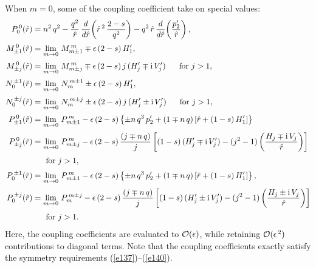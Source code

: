 \documentclass[12pt,prb,aps]{revtex4-1}
\begin{document}
When $m=0$, some of the coupling coefficient take on special values: 
\begin{align}
P_0^{\,0}(\hat{r})&=n^2\,q^2-\frac{q^2}{\hat{r}}\,\frac{d}{d\hat{r}}\!\left(\hat{r}^{\,2}\,\frac{2-s}{q^2}\right)-q^2\,\hat{r}\,\frac{d}{d\hat{r}}\!\left(
\frac{p_2'}{\hat{r}}\right),\\[0.5ex]
M_{\pm 1}^{\,0}(\hat{r}) &= \lim_{m\rightarrow 0}\,M_{m\pm 1}^{\,m} \mp\epsilon\,(2-s)\,H_1',\\[0.5ex]
M_{\pm j}^{\,0}(\hat{r}) &= \lim_{m\rightarrow 0}\,M_{m\pm j}^{\,m} \mp\epsilon\,(2-s)\,j\,(H_j'\mp{\rm i}\,V_j')\mbox{~~~~~for $j>1$},\\[0.5ex]
N_0^{\,\pm 1}(\hat{r}) &= \lim_{m\rightarrow 0}\,N_m^{\,m\pm 1} \pm\epsilon\,(2-s)\,H_1',\\[0.5ex]
N_0^{\,\pm j}(\hat{r}) &= \lim_{m\rightarrow 0}\,N_m^{\,m\pm j} \pm\epsilon\,(2-s)\,j\,(H_j'\pm{\rm i}\,V_j')\mbox{~~~~~for $j>1$},\\[0.5ex]
P_{\pm 1}^{\,0}(\hat{r})&= \lim_{m\rightarrow 0}\,P_{m\pm 1}^{\,m}-\epsilon\,(2-s)\left\{\pm n\,q^3\,p_2'+(1\mp n\,q)\left[\hat{r}+(1-s)\,H_1'\right]\right\}\\[0.5ex]
P_{\pm j}^{\,0}(\hat{r}) & =\lim_{m\rightarrow 0}\,P_{m\pm j}^{\,m}-\epsilon\,(2-s)\,\frac{(j\mp n\,q)}{j}
\left[(1-s)\,(H_j'\mp{\rm i}\,V_j')-(j^2-1)\left(\frac{H_j\mp {\rm i}\,V_j}{\hat{r}}\right)\right]\nonumber\\[0.5ex]&\mbox{~~~~~for $j>1$},\\[0.5ex]
P_0^{\,\pm 1}(\hat{r})&= \lim_{m\rightarrow 0}\,P_{m\pm 1}^{\,m}-\epsilon\,(2-s)\left\{\pm n\,q^3\,p_2'+(1\mp n\,q)\left[\hat{r}+(1-s)\,H_1'\right]\right\},\\[0.5ex]
P_0^{\,\pm j}(\hat{r})&=\lim_{m\rightarrow 0}\,P_m^{\,m\pm j}-\epsilon\,(2-s)\,\frac{(j\mp n\,q)}{j}
\left[(1-s)\,(H_j'\pm {\rm i}\,V_j')-(j^2-1)\left(\frac{H_j\pm {\rm i}\,V_j}{\hat{r}}\right)\right]\nonumber\\[0.5ex]&\mbox{~~~~~for $j>1$}.
\end{align}
Here, the coupling coefficients are evaluated to ${\cal O}(\epsilon)$, while retaining ${\cal O}(\epsilon^{\,2})$ contributions to diagonal terms.\cite{connor,am1}
Note that the coupling coefficients exactly satisfy the symmetry requirements (\ref{e137})--(\ref{e140}).
\end{document}
